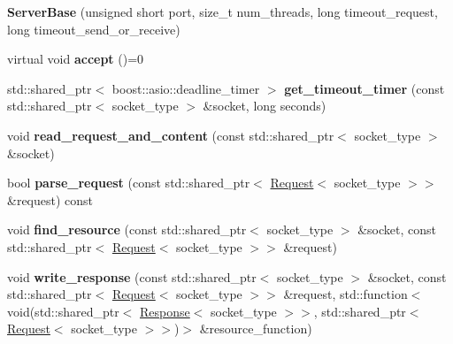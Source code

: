 \begin{DoxyCompactItemize}
\item 
\mbox{\label{classhttp_1_1_server_base_a29d14258f3e8863548793a50416a36af}} 
{\bfseries Server\+Base} (unsigned short port, size\+\_\+t num\+\_\+threads, long timeout\+\_\+request, long timeout\+\_\+send\+\_\+or\+\_\+receive)
\item 
\mbox{\label{classhttp_1_1_server_base_aa00dabdeb36dad9d15a07dc5bb30bb34}} 
virtual void {\bfseries accept} ()=0
\item 
\mbox{\label{classhttp_1_1_server_base_a34f54d33cbbe7a1bfefc11752b5aeb49}} 
std\+::shared\+\_\+ptr$<$ boost\+::asio\+::deadline\+\_\+timer $>$ {\bfseries get\+\_\+timeout\+\_\+timer} (const std\+::shared\+\_\+ptr$<$ socket\+\_\+type $>$ \&socket, long seconds)
\item 
\mbox{\label{classhttp_1_1_server_base_ae023912f61f873ee1a4bf952b96a6279}} 
void {\bfseries read\+\_\+request\+\_\+and\+\_\+content} (const std\+::shared\+\_\+ptr$<$ socket\+\_\+type $>$ \&socket)
\item 
\mbox{\label{classhttp_1_1_server_base_a1bee7bab9610b998f5b5c61491bddfd3}} 
bool {\bfseries parse\+\_\+request} (const std\+::shared\+\_\+ptr$<$ \hyperlink{classhttp_1_1_server_base_1_1_request}{Request}$<$ socket\+\_\+type $>$$>$ \&request) const
\item 
\mbox{\label{classhttp_1_1_server_base_af9e30675529edb8377870a2af74d121f}} 
void {\bfseries find\+\_\+resource} (const std\+::shared\+\_\+ptr$<$ socket\+\_\+type $>$ \&socket, const std\+::shared\+\_\+ptr$<$ \hyperlink{classhttp_1_1_server_base_1_1_request}{Request}$<$ socket\+\_\+type $>$$>$ \&request)
\item 
\mbox{\label{classhttp_1_1_server_base_aa78183e68edbf228e2cf8ac00494e7ba}} 
void {\bfseries write\+\_\+response} (const std\+::shared\+\_\+ptr$<$ socket\+\_\+type $>$ \&socket, const std\+::shared\+\_\+ptr$<$ \hyperlink{classhttp_1_1_server_base_1_1_request}{Request}$<$ socket\+\_\+type $>$$>$ \&request, std\+::function$<$ void(std\+::shared\+\_\+ptr$<$ \hyperlink{classhttp_1_1_server_base_1_1_response}{Response}$<$ socket\+\_\+type $>$$>$, std\+::shared\+\_\+ptr$<$ \hyperlink{classhttp_1_1_server_base_1_1_request}{Request}$<$ socket\+\_\+type $>$$>$)$>$ \&resource\+\_\+function)
\end{DoxyCompactItemize}
